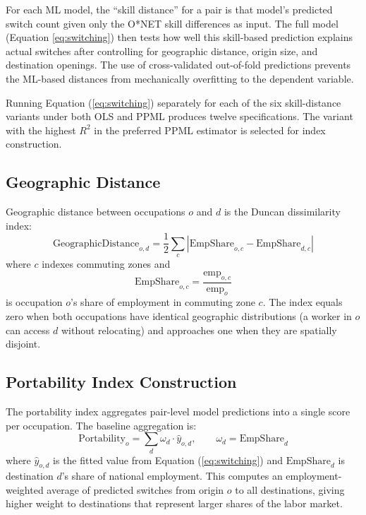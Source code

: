 \documentclass[12pt]{article}
\begin{document}
For each ML model, the ``skill distance'' for a pair is that model's predicted switch count given only the O*NET skill differences as input. The full model (Equation \ref{eq:switching}) then tests how well this skill-based prediction explains actual switches after controlling for geographic distance, origin size, and destination openings. The use of cross-validated out-of-fold predictions prevents the ML-based distances from mechanically overfitting to the dependent variable.

Running Equation (\ref{eq:switching}) separately for each of the six skill-distance variants under both OLS and PPML produces twelve specifications. The variant with the highest $R^2$ in the preferred PPML estimator is selected for index construction.

\subsection{Geographic Distance}
\label{sec:strategy_geo}

Geographic distance between occupations $o$ and $d$ is the Duncan dissimilarity index:
\begin{equation}
\label{eq:duncan}
\text{GeographicDistance}_{o,d} = \frac{1}{2} \sum_{c} \left| \text{EmpShare}_{o,c} - \text{EmpShare}_{d,c} \right|
\end{equation}
where $c$ indexes commuting zones and
\begin{equation}
\label{eq:empshare}
\text{EmpShare}_{o,c} = \frac{\text{emp}_{o,c}}{\text{emp}_o}
\end{equation}
is occupation $o$'s share of employment in commuting zone $c$. The index equals zero when both occupations have identical geographic distributions (a worker in $o$ can access $d$ without relocating) and approaches one when they are spatially disjoint.

\subsection{Portability Index Construction}
\label{sec:strategy_index}

The portability index aggregates pair-level model predictions into a single score per occupation. The baseline aggregation is:
\begin{equation}
\label{eq:portability}
\text{Portability}_o = \sum_{d} \omega_d \cdot \hat{y}_{o,d}, \qquad \omega_d = \text{EmpShare}_d
\end{equation}
where $\hat{y}_{o,d}$ is the fitted value from Equation (\ref{eq:switching}) and $\text{EmpShare}_d$ is destination $d$'s share of national employment. This computes an employment-weighted average of predicted switches from origin $o$ to all destinations, giving higher weight to destinations that represent larger shares of the labor market.
\end{document}
